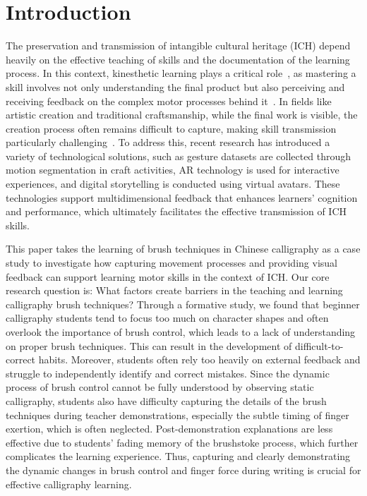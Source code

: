 \section{Introduction}
The preservation and transmission of intangible cultural heritage (ICH) depend heavily on the effective teaching of skills and the documentation of the learning process. In this context, kinesthetic learning plays a critical role~\cite{TechnologyIntervention}, as mastering a skill involves not only understanding the final product but also perceiving and receiving feedback on the complex motor processes behind it~\cite{begel2004kinesthetic, magill2010motor}. In fields like artistic creation and traditional craftsmanship, while the final work is visible, the creation process often remains difficult to capture, making skill transmission particularly challenging~\cite{10.1145/3613904.3642205}. To address this, recent research has introduced a variety of technological solutions, such as gesture datasets are collected through motion segmentation in craft activities\cite{app10207325}, AR technology is used for interactive experiences\cite{app12199859}, and digital storytelling is conducted using virtual avatars\cite{https://doi.org/10.1111/j.1467-8535.2009.00991.x}. These technologies support multidimensional feedback that enhances learners' cognition and performance, which ultimately facilitates the effective transmission of ICH skills.

This paper takes the learning of brush techniques in Chinese calligraphy as a case study to investigate how capturing movement processes and providing visual feedback can support learning motor skills in the context of ICH. Our core research question is: What factors create barriers in the teaching and learning calligraphy brush techniques? Through a formative study, we found that beginner calligraphy students tend to focus too much on character shapes and often overlook the importance of brush control, which leads to a lack of understanding on proper brush techniques. This can result in the development of difficult-to-correct habits. Moreover, students often rely too heavily on external feedback and struggle to independently identify and correct mistakes. Since the dynamic process of brush control cannot be fully understood by observing static calligraphy, students also have difficulty capturing the details of the brush techniques during teacher demonstrations, especially the subtle timing of finger exertion, which is often neglected. Post-demonstration explanations are less effective due to students' fading memory of the brushstoke process, which further complicates the learning experience. Thus, capturing and clearly demonstrating the dynamic changes in brush control and finger force during writing is crucial for effective calligraphy learning.

